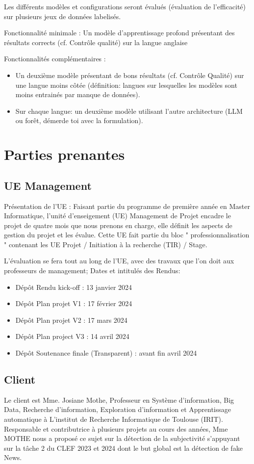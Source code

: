 \documentclass[11pt]{rapport_class}
\begin{document}
Les différents modèles et configurations seront évalués (évaluation de l'efficacité) sur plusieurs jeux de données labelisés.

Fonctionnalité minimale : Un modèle d'apprentissage profond présentant des résultats corrects (cf. Contrôle qualité) sur la langue anglaise

Fonctionnalités complémentaires : 
\begin{itemize}
\item Un deuxième modèle présentant de bons résultats (cf. Contrôle Qualité) sur une langue moins côtée (définition: langues sur lesquelles les modèles sont moins entrainés par manque de données). 
\item Sur chaque langue: un deuxième modèle utilisant l'autre architecture (LLM ou forêt, démerde toi avec la formulation).
\end{itemize}

\section{Parties prenantes}
\subsection{UE Management}
\qquad Présentation de l'UE : Faisant partie du programme de première année en Master Informatique, l'unité d'enseigement (UE) Management de Projet encadre le projet de quatre mois que nous prenons en charge, elle définit les aspects de gestion du projet et les évalue. Cette UE fait partie du bloc " professionnalisation " contenant les UE Projet / Initiation à la recherche (TIR) / Stage.

L'évaluation se fera tout au long de l'UE, avec des travaux que l'on doit aux professeurs de management;
Dates et intitulés des Rendus:
\begin{itemize}
    \item Dépôt Rendu kick-off  : 13 janvier 2024
    \item Dépôt Plan projet V1  : 17 février 2024
    \item Dépôt Plan projet V2  : 17 mars 2024
    \item Dépôt Plan project V3 : 14 avril 2024
    \item Dépôt Soutenance finale (Transparent) : avant fin avril 2024
\end{itemize}


\subsection{Client}
\qquad Le client est Mme. Josiane Mothe, Professeur en Système d'information, Big Data, Recherche d'information, Exploration d'information et Apprentissage automatique à L'institut de Recherche Informatique de Toulouse (IRIT). Responsable et contributrice à plusieurs projets au cours des années, Mme MOTHE nous a proposé ce sujet sur la détection de la subjectivité s'appuyant sur la tâche 2 du CLEF 2023 et 2024 dont le but global est la détection de fake News.
\end{document}
